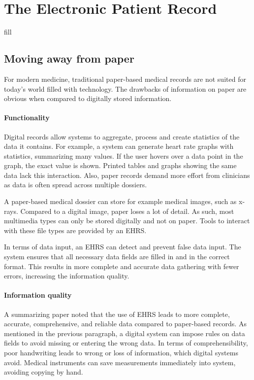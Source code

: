 \section{The Electronic Patient Record}\label{background}

fill

    \subsection{Moving away from paper}\label{2_ehrs_paper}

    For modern medicine, traditional paper-based medical records are not suited for today's world filled with technology. The drawbacks of information on paper are obvious when compared to digitally stored information.

    \paragraph{Functionality} Digital records allow systems to aggregate, process and create statistics of the data it contains. For example, a system can generate heart rate graphs with statistics, summarizing many values. If the user hovers over a data point in the graph, the exact value is shown. Printed tables and graphs showing the same data lack this interaction. Also, paper records demand more effort from clinicians as data is often spread across multiple dossiers.

    A paper-based medical dossier can store for example medical images, such as x-rays. Compared to a digital image, paper loses a lot of detail. As such, most multimedia types can only be stored digitally and not on paper. Tools to interact with these file types are provided by an EHRS\@.

    In terms of data input, an EHRS can detect and prevent false data input. The system ensures that all necessary data fields are filled in and in the correct format. This results in more complete and accurate data gathering with fewer errors, increasing the information quality.

    \paragraph{Information quality} A summarizing paper noted that the use of EHRS leads to more complete, accurate, comprehensive, and reliable data compared to paper-based records\cite{ehrs_summary}. As mentioned in the previous paragraph, a digital system can impose rules on data fields to avoid missing or entering the wrong data. In terms of comprehensibility, poor handwriting leads to wrong or loss of information, which digital systems avoid. Medical instruments can save measurements immediately into system, avoiding copying by hand.

